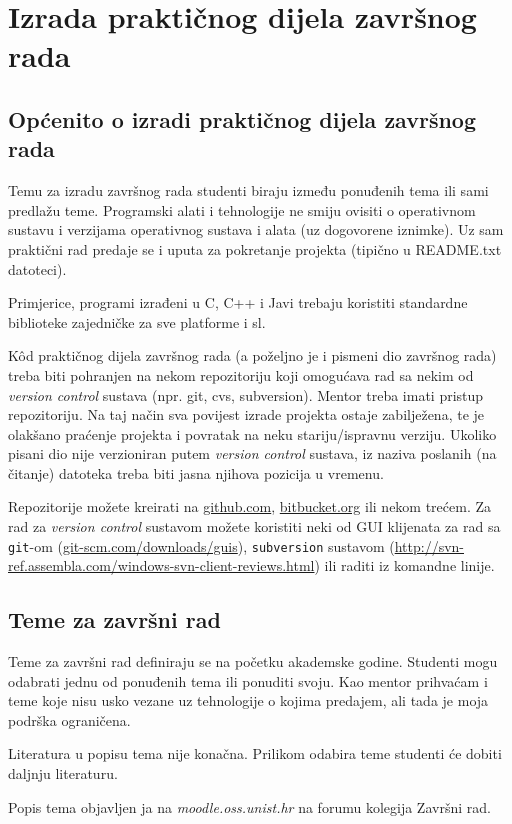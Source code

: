 \section{Izrada praktičnog dijela završnog rada}
\subsection{Općenito o izradi praktičnog dijela završnog rada}
Temu za izradu završnog rada studenti biraju između ponuđenih tema ili sami predlažu teme. Programski alati i tehnologije ne smiju ovisiti 
o operativnom sustavu i verzijama operativnog sustava i alata (uz dogovorene iznimke). Uz sam praktični rad predaje se i uputa za pokretanje 
projekta (tipično u README.txt datoteci).

Primjerice, programi izrađeni u C, C++ i Javi trebaju koristiti standardne
 biblioteke zajedničke za sve platforme i sl.
 
 K\^od praktičnog dijela završnog rada (a poželjno je i pismeni dio završnog rada) treba biti pohranjen na nekom repozitoriju koji omogućava rad sa nekim od \textit{version control} sustava (npr. git, cvs, subversion). Mentor treba imati pristup repozitoriju.
Na taj način sva povijest izrade projekta ostaje zabilježena, te je olakšano praćenje projekta i povratak na neku stariju/ispravnu verziju. Ukoliko pisani dio nije verzioniran putem \textit{version control}
 sustava, iz naziva poslanih (na čitanje) datoteka treba biti jasna njihova pozicija u vremenu.  
 
Repozitorije možete kreirati na \url{github.com}, \url{bitbucket.org} ili nekom trećem. Za rad za \textit{version control} sustavom možete koristiti neki od GUI klijenata za rad sa 
 \texttt{git}-om (\url{git-scm.com/downloads/guis}), \texttt{subversion} sustavom (\url{http://svn-ref.assembla.com/windows-svn-client-reviews.html}) ili raditi iz komandne linije.
\subsection{Teme za završni rad}
Teme za završni rad definiraju se na početku akademske godine. Studenti mogu odabrati jednu od ponuđenih tema ili ponuditi svoju. Kao mentor prihvaćam i teme koje nisu usko vezane uz tehnologije o kojima predajem, ali tada je moja podrška ograničena.

Literatura u popisu tema nije konačna. Prilikom odabira teme studenti će dobiti daljnju literaturu.

Popis tema objavljen ja na \textit{moodle.oss.unist.hr} na forumu kolegija Završni rad.








